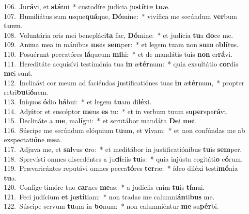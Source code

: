 {106.~}Ju\textbf{rá}vi, et \textbf{stá}tui~* custodíre judícia ju\textbf{stí}tiæ \textbf{tu}æ.\\
{107.~}Humiliátus sum usque\textbf{quá}que, \textbf{Dó}mine:~* vivífica me secúndum \textbf{ver}bum \textbf{tu}um.\\
{108.~}Voluntária oris mei benepláci\textbf{ta} fac, \textbf{Dó}mine:~* et judícia \textbf{tu}a \textbf{do}ce me.\\
{109.~}Anima mea in mánibus \textbf{me}is \textbf{sem}per:~* et legem tuam non \textbf{sum} o\textbf{blí}tus.\\
{110.~}Posuérunt peccatóres \textbf{lá}queum \textbf{mi}hi:~* et de mandátis tuis \textbf{non} er\textbf{rá}vi.\\
{111.~}Hereditáte acquisívi testimónia tua \textbf{in} æ\textbf{tér}num:~* quia exsultátio \textbf{cor}dis \textbf{me}i sunt.\\
{112.~}Inclinávi cor meum ad faciéndas justificatiónes tuas \textbf{in} æ\textbf{tér}num,~* propter retri\textbf{bu}ti\textbf{ó}nem.\\
{113.~}Iníquos \textbf{ó}dio \textbf{há}bui:~* et legem \textbf{tu}am di\textbf{lé}xi.\\
{114.~}Adjútor et suscéptor \textbf{me}us \textbf{es} tu:~* et in verbum tuum su\textbf{per}spe\textbf{rá}vi.\\
{115.~}Declináte a \textbf{me}, ma\textbf{lí}gni:~* et scrutábor mandáta \textbf{De}i \textbf{me}i.\\
{116.~}Súscipe me secúndum elóquium \textbf{tu}um, et \textbf{vi}vam:~* et non confúndas me ab exspectati\textbf{ó}ne \textbf{me}a.\\
{117.~}Adjuva me, et \textbf{sal}vus \textbf{e}ro:~* et meditábor in justificatiónibus \textbf{tu}is \textbf{sem}per.\\
{118.~}Sprevísti omnes discedéntes a ju\textbf{dí}ciis \textbf{tu}is:~* quia injústa cogitáti\textbf{o} e\textbf{ó}rum.\\
{119.~}Prævaricántes reputávi omnes pecca\textbf{tó}res \textbf{ter}ræ:~* ídeo diléxi testi\textbf{mó}nia \textbf{tu}a.\\
{120.~}Confíge timóre tuo \textbf{car}nes \textbf{me}as:~* a judíciis enim \textbf{tu}is \textbf{tí}mui.\\
{121.~}Feci judícium \textbf{et} ju\textbf{stí}tiam:~* non tradas me calumni\textbf{án}ti\textbf{bus} me.\\
{122.~}Súscipe servum \textbf{tu}um in \textbf{bo}num:~* non calumniéntur \textbf{me} su\textbf{pér}bi.\\
